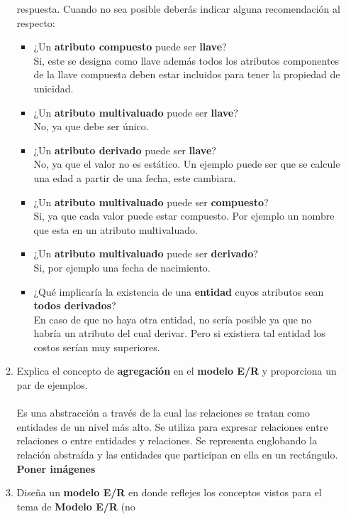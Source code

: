\documentclass{article}
\begin{document}
\begin{enumerate}
\begin{enumerate}
				respuesta. Cuando no sea posible deberás indicar alguna recomendación al respecto:
				\begin{itemize}
					\item ¿Un \textbf{atributo compuesto} puede ser \textbf{llave}?
					\\Si, este se designa como llave además todos los atributos componentes de la llave compuesta deben estar incluidos para tener la propiedad de unicidad. 
					\item ¿Un \textbf{atributo multivaluado} puede ser \textbf{llave}? 
					\\No, ya que debe ser único.
					\item ¿Un \textbf{atributo derivado} puede ser \textbf{llave}? 
					\\No, ya que el valor no es estático. Un ejemplo puede ser que se calcule una edad a partir de una fecha, este cambiara. 
					\item ¿Un \textbf{atributo multivaluado} puede ser \textbf{compuesto}? 
					\\Si, ya que cada valor puede estar compuesto. Por ejemplo un nombre que esta en un atributo multivaluado.
					\item ¿Un \textbf{atributo multivaluado} puede ser \textbf{derivado}? 
					\\Si, por ejemplo una fecha de nacimiento.
					\item ¿Qué implicaría la existencia de una \textbf{entidad} cuyos atributos sean \textbf{todos derivados}?				
					\\En caso de que no haya otra entidad, no sería posible ya que no habría un atributo del cual derivar. Pero si existiera tal entidad los costos serían muy superiores.\\
				\end{itemize}
				\item Explica el concepto de \textbf{agregación} en el \textbf{modelo E/R} y proporciona un par de ejemplos.
				\\\\Es una abstracción a través de la cual las relaciones se tratan como entidades de un nivel más alto. Se utiliza para expresar relaciones entre relaciones o entre entidades y relaciones. Se representa englobando la relación abstraída y las entidades que participan en ella en un rectángulo.\\
				\textbf{Poner imágenes}
				\item Diseña un \textbf{modelo E/R} en donde reflejes los conceptos vistos para el tema de \textbf{Modelo E/R} (no

\end{enumerate}
\end{enumerate}
\end{document}
